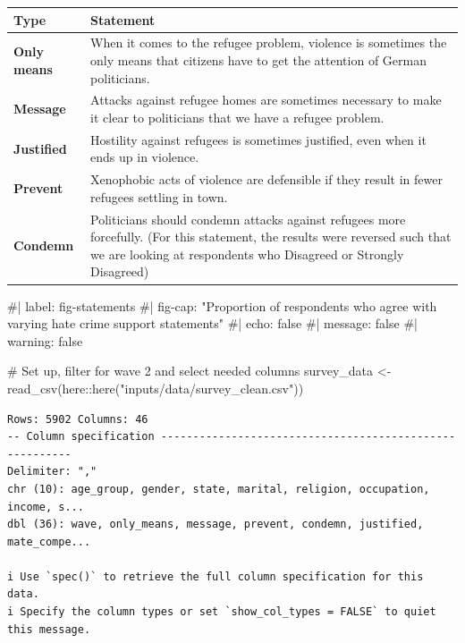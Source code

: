 \documentclass[
]{article}
\newenvironment{Shaded}{\begin{snugshade}}{\end{snugshade}}
\newcommand{\CommentTok}[1]{\textcolor[rgb]{0.37,0.37,0.37}{#1}}
\newcommand{\FunctionTok}[1]{\textcolor[rgb]{0.28,0.35,0.67}{#1}}
\newcommand{\NormalTok}[1]{\textcolor[rgb]{0.00,0.23,0.31}{#1}}
\newcommand{\OtherTok}[1]{\textcolor[rgb]{0.00,0.23,0.31}{#1}}
\newcommand{\SpecialCharTok}[1]{\textcolor[rgb]{0.37,0.37,0.37}{#1}}
\newcommand{\StringTok}[1]{\textcolor[rgb]{0.13,0.47,0.30}{#1}}
\begin{document}
\begin{tabular}{>{\raggedright\arraybackslash}p{7em}>{\raggedright\arraybackslash}p{35em}}
\toprule
Type & Statement\\
\midrule
\textbf{Only means} & When it comes to the refugee problem, violence is sometimes the only means that citizens have to get the attention of German politicians.\\
\textbf{Message} & Attacks against refugee homes are sometimes necessary to make it clear to politicians that we have a refugee problem.\\
\textbf{Justified} & Hostility against refugees is sometimes justified, even when it ends up in violence.\\
\textbf{Prevent} & Xenophobic acts of violence are defensible if they result in fewer refugees settling in town.\\
\textbf{Condemn} & Politicians should condemn attacks against refugees more forcefully. (For this statement, the results were reversed such that we are looking at respondents who Disagreed or Strongly Disagreed)\\
\bottomrule
\end{tabular}

\begin{Shaded}
\begin{Highlighting}[]
\CommentTok{\#| label: fig{-}statements}
\CommentTok{\#| fig{-}cap: "Proportion of respondents who agree with varying hate crime support statements"}
\CommentTok{\#| echo: false}
\CommentTok{\#| message: false}
\CommentTok{\#| warning: false}

\CommentTok{\# Set up, filter for wave 2 and select needed columns}
\NormalTok{survey\_data }\OtherTok{\textless{}{-}} \FunctionTok{read\_csv}\NormalTok{(here}\SpecialCharTok{::}\FunctionTok{here}\NormalTok{(}\StringTok{"inputs/data/survey\_clean.csv"}\NormalTok{))}
\end{Highlighting}
\end{Shaded}

\begin{verbatim}
Rows: 5902 Columns: 46
-- Column specification --------------------------------------------------------
Delimiter: ","
chr (10): age_group, gender, state, marital, religion, occupation, income, s...
dbl (36): wave, only_means, message, prevent, condemn, justified, mate_compe...

i Use `spec()` to retrieve the full column specification for this data.
i Specify the column types or set `show_col_types = FALSE` to quiet this message.
\end{verbatim}
\end{document}
